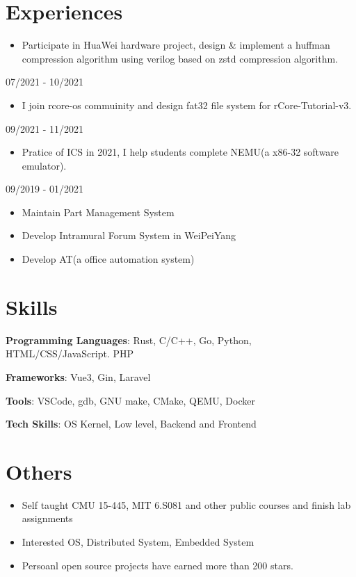 \documentclass{chicv}
\begin{document}
\section{Experiences}
\begin{itemize}
  \item Participate in HuaWei hardware project, design \& implement a huffman compression algorithm using verilog based on zstd compression algorithm.
\end{itemize}
{07/2021 - 10/2021}
\begin{itemize}
  \item I join rcore-os commuinity and design fat32 file system for rCore-Tutorial-v3.
\end{itemize}

{09/2021 - 11/2021}
\begin{itemize}
  \item Pratice of ICS in 2021, I help students complete NEMU(a x86-32 software emulator).
\end{itemize}

{09/2019 - 01/2021}
\begin{itemize}
  \item Maintain Part Management System 
  \item Develop Intramural Forum System in WeiPeiYang
  \item Develop AT(a office automation system)
\end{itemize}



\section{Skills}

\begin{compactlist}
  \item \textbf{Programming Languages}: Rust, C/C++, Go, Python, HTML/CSS/JavaScript. PHP
  \item \textbf{Frameworks}: Vue3, Gin, Laravel
  \item \textbf{Tools}: VSCode, gdb, GNU make, CMake, QEMU, Docker
  \item \textbf{Tech Skills}: OS Kernel, Low level, Backend and Frontend
\end{compactlist}

\section{Others}
\begin{itemize}
  \item Self taught CMU 15-445, MIT 6.S081 and other public courses and finish lab assignments 
  \item Interested OS, Distributed System, Embedded System 
  \item Persoanl open source projects have earned more than 200 stars.
\end{itemize}
\end{document}
